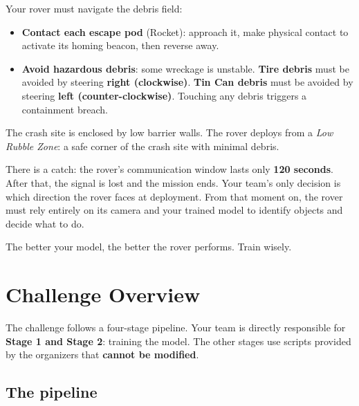 \documentclass[a4]{article}
\begin{document}
Your rover must navigate the debris field:
\begin{itemize}
    \item \textbf{Contact each escape pod} (Rocket): approach it, make physical contact to activate its homing beacon, then reverse away.
    \item \textbf{Avoid hazardous debris}: some wreckage is unstable. \textbf{Tire debris} must be avoided by steering \textbf{right (clockwise)}. \textbf{Tin Can debris} must be avoided by steering \textbf{left (counter-clockwise)}. Touching any debris triggers a containment breach.
\end{itemize}

The crash site is enclosed by low barrier walls. The rover deploys from a \textit{Low Rubble Zone}: a safe corner of the crash site with minimal debris.

There is a catch: the rover's communication window lasts only \textbf{120 seconds}. After that, the signal is lost and the mission ends. Your team's only decision is which direction the rover faces at deployment. From that moment on, the rover must rely entirely on its camera and your trained model to identify objects and decide what to do.

The better your model, the better the rover performs. Train wisely.

\pagebreak
\section*{Challenge Overview}

The challenge follows a four-stage pipeline. Your team is directly responsible for \textbf{Stage 1 and Stage 2}: training the model. The other stages use scripts provided by the organizers that \textbf{cannot be modified}.

\subsection*{The pipeline}
\end{document}
